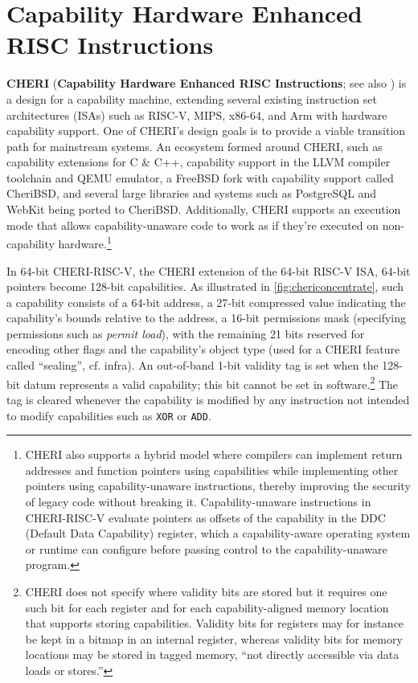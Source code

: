 \documentclass[main.tex]{subfiles}
\begin{document}
\section{Capability Hardware Enhanced RISC Instructions}
\textbf{CHERI} (\textbf{Capability Hardware Enhanced RISC Instructions}; see also \citet{intro2cheri}) is a design for a capability machine, extending several existing instruction set architectures (ISAs) such as RISC-V, MIPS, x86-64, and Arm with hardware capability support. One of CHERI’s design goals is to provide a viable transition path for mainstream systems. An ecosystem formed around CHERI, such as capability extensions for C \& C++, capability support in the LLVM compiler toolchain and QEMU emulator, a FreeBSD fork with capability support called CheriBSD, and several large libraries and systems such as PostgreSQL and WebKit being ported to CheriBSD. Additionally, CHERI supports an execution mode that allows capability-unaware code to work as if they're executed on non-capability hardware.\footnote{CHERI also supports a hybrid model where compilers can implement return addresses and function pointers using capabilities while implementing other pointers using capability-unaware instructions, thereby improving the security of legacy code without breaking it. Capability-unaware instructions in CHERI-RISC-V evaluate pointers as offsets of the capability in the DDC (Default Data Capability) register, which a capability-aware operating system or runtime can configure before passing control to the capability-unaware program.}

In 64-bit CHERI-RISC-V, the CHERI extension of the 64-bit RISC-V ISA, 64-bit pointers become 128-bit capabilities. As illustrated in \cref{fig:chericoncentrate}, such a capability consists of a 64-bit address, a 27-bit compressed value indicating the capability’s bounds relative to the address, a 16-bit permissions mask (specifying permissions such as \emph{permit load}), with the remaining 21 bits reserved for encoding other flags and the capability’s object type (used for a CHERI feature called \enquote{\gls*{sealing}}, cf. infra). An out-of-band 1-bit validity tag is set when the 128-bit datum represents a valid capability; this bit cannot be set in software.\footnote{CHERI does not specify where validity bits are stored but it requires one such bit for each register and for each capability-aligned memory location that supports storing capabilities. Validity bits for registers may for instance be kept in a bitmap in an internal register, whereas validity bits for memory locations may be stored in tagged memory, \enquote{not directly accessible via data loads or stores.}} The tag is cleared whenever the capability is modified by any instruction not intended to modify capabilities such as \texttt{XOR} or \texttt{ADD}.
\end{document}
